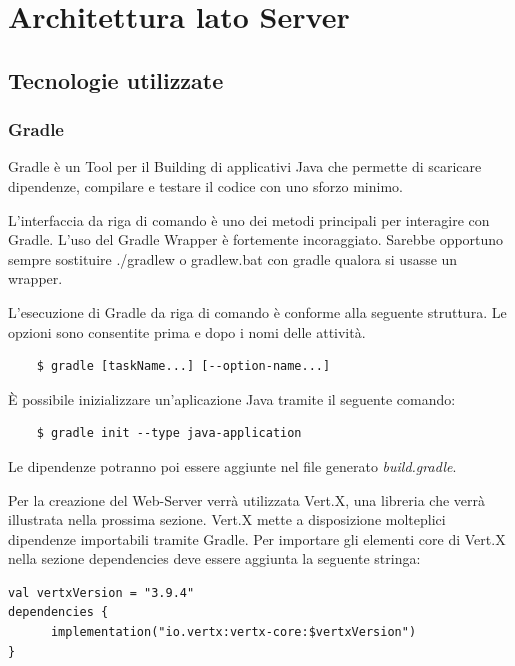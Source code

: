 \section{Architettura lato Server}
\subsection{Tecnologie utilizzate}

\subsubsection{Gradle}
Gradle è un Tool per il Building di applicativi Java che permette di scaricare dipendenze, compilare e testare il codice con uno sforzo minimo.\newline

\noindent L'interfaccia da riga di comando è uno dei metodi principali per interagire con Gradle.
L'uso del Gradle Wrapper è fortemente incoraggiato. Sarebbe opportuno sempre sostituire ./gradlew o gradlew.bat con gradle qualora si usasse un wrapper.

\noindent L'esecuzione di Gradle da riga di comando è conforme alla seguente struttura. Le opzioni sono consentite prima e dopo i nomi delle attività.

\begin{verbatim}
    $ gradle [taskName...] [--option-name...]
\end{verbatim}

\noindent È possibile inizializzare un'aplicazione Java tramite il seguente comando:
\begin{verbatim}
    $ gradle init --type java-application
\end{verbatim}

\noindent Le dipendenze potranno poi essere aggiunte nel file generato \textit{build.gradle}.\newline

Per la creazione del Web-Server verrà utilizzata  Vert.X, una libreria che verrà illustrata nella prossima sezione.\newline
Vert.X mette a disposizione molteplici dipendenze importabili tramite Gradle.
Per importare gli elementi core di Vert.X nella sezione dependencies deve essere aggiunta la seguente stringa:
\begin{verbatim}
val vertxVersion = "3.9.4"
dependencies {
      implementation("io.vertx:vertx-core:$vertxVersion")
}
\end{verbatim}

